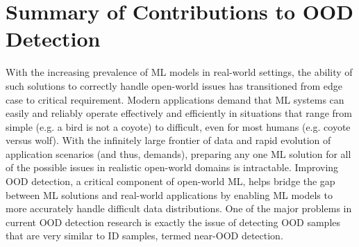 \section{Summary of Contributions to OOD Detection}
\label{sec:summ}

With the increasing prevalence of ML models in real-world settings, the ability of such solutions to correctly handle open-world issues has transitioned from edge case to critical requirement. Modern applications demand that ML systems can easily and reliably operate effectively and efficiently in situations that range from simple (e.g. a bird is not a coyote) to difficult, even for most humans (e.g. coyote versus wolf). With the infinitely large frontier of data and rapid evolution of application scenarios (and thus, demands), preparing any one ML solution for all of the possible issues in realistic open-world domains is intractable. Improving OOD detection, a critical component of open-world ML, helps bridge the gap between ML solutions and real-world applications by enabling ML models to more accurately handle difficult data distributions. One of the major problems in current OOD detection research is exactly the issue of detecting OOD samples that are very similar to ID samples, termed near-OOD detection.

